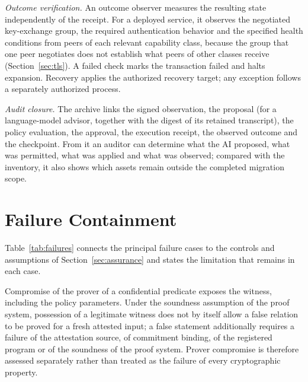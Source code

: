 \emph{Outcome verification.} An outcome observer measures the resulting state independently of the receipt. For a deployed service, it observes the negotiated key-exchange group, the required authentication behavior and the specified health conditions from peers of each relevant capability class, because the group that one peer negotiates does not establish what peers of other classes receive~\cite{han} (Section~\ref{sec:tls}). A failed check marks the transaction failed and halts expansion. Recovery applies the authorized recovery target; any exception follows a separately authorized process.

\emph{Audit closure.} The archive links the signed observation, the proposal (for a language-model advisor, together with the digest of its retained transcript), the policy evaluation, the approval, the execution receipt, the observed outcome and the checkpoint. From it an auditor can determine what the AI proposed, what was permitted, what was applied and what was observed; compared with the inventory, it also shows which assets remain outside the completed migration scope.

\section{Failure Containment}
\label{s:failures}
Table~\ref{tab:failures} connects the principal failure cases to the controls and assumptions of Section~\ref{sec:assurance} and states the limitation that remains in each case.

Compromise of the prover of a confidential predicate exposes the witness, including the policy parameters. Under the soundness assumption of the proof system, possession of a legitimate witness does not by itself allow a false relation to be proved for a fresh attested input; a false statement additionally requires a failure of the attestation source, of commitment binding, of the registered program or of the soundness of the proof system. Prover compromise is therefore assessed separately rather than treated as the failure of every cryptographic property.

